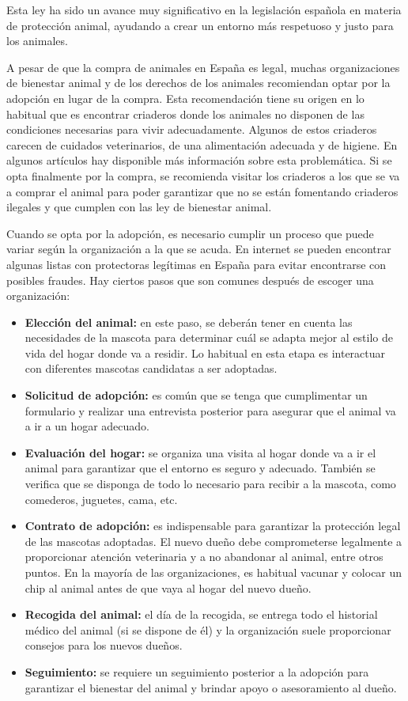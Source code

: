 \documentclass[a4paper, 12pt]{article}
\begin{document}
Esta ley ha sido un avance muy significativo en la legislación española en materia de protección animal, ayudando a crear un entorno más respetuoso y justo para los animales.

A pesar de que la compra de animales en España es legal, muchas organizaciones de bienestar animal y de los derechos de los animales recomiendan optar por la adopción en lugar de la compra. Esta recomendación tiene su origen en lo habitual que es encontrar criaderos donde los animales no disponen de las condiciones necesarias para vivir adecuadamente. Algunos de estos criaderos carecen de cuidados veterinarios, de una alimentación adecuada y de higiene. En algunos artículos \cite{petalatino} hay disponible más información sobre esta problemática. Si se opta finalmente por la compra, se recomienda visitar los criaderos a los que se va a comprar el animal para poder garantizar que no se están fomentando criaderos ilegales y que cumplen con las ley de bienestar animal.


Cuando se opta por la adopción, es necesario cumplir un proceso que puede variar según la organización a la que se acuda. En internet se pueden encontrar algunas listas con protectoras legítimas en España \cite{adda} para evitar encontrarse con posibles fraudes. Hay ciertos pasos que son comunes después de escoger una organización:

\begin{itemize}[noitemsep]
\item \textbf{Elección del animal:} en este paso, se deberán tener en cuenta las necesidades de la mascota para determinar cuál se adapta mejor al estilo de vida del hogar donde va a residir. Lo habitual en esta etapa es interactuar con diferentes mascotas candidatas a ser adoptadas.
\item \textbf{Solicitud de adopción:} es común que se tenga que cumplimentar un formulario y realizar una entrevista posterior para asegurar que el animal va a ir a un hogar adecuado.
\item \textbf{Evaluación del hogar:} se organiza una visita al hogar donde va a ir el animal para garantizar que el entorno es seguro y adecuado. También se verifica que se disponga de todo lo necesario para recibir a la mascota, como comederos, juguetes, cama, etc.
\item \textbf{Contrato de adopción:} es indispensable para garantizar la protección legal de las mascotas adoptadas. El nuevo dueño debe comprometerse legalmente a proporcionar atención veterinaria y a no abandonar al animal, entre otros puntos. En la mayoría de las organizaciones, es habitual vacunar y colocar un chip al animal antes de que vaya al hogar del nuevo dueño.
\item \textbf{Recogida del animal:} el día de la recogida, se entrega todo el historial médico del animal (si se dispone de él) y la organización suele proporcionar consejos para los nuevos dueños.
\item \textbf{Seguimiento:} se requiere un seguimiento posterior a la adopción para garantizar el bienestar del animal y brindar apoyo o asesoramiento al dueño.
\end{itemize}
\end{document}

